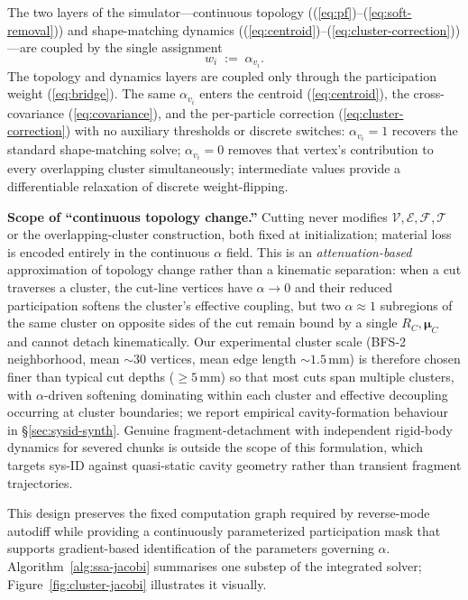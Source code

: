 \documentclass[letterpaper, 10 pt, conference]{ieeeconf}  %
\theoremstyle{tight}
\begin{document}
The two layers of the simulator---continuous topology
((\ref{eq:pf})--(\ref{eq:soft-removal})) and shape-matching dynamics
((\ref{eq:centroid})--(\ref{eq:cluster-correction}))---are coupled by
the single assignment
\begin{equation}
  w_i \;:=\; \alpha_{v_i}.
  \label{eq:bridge}
\end{equation}
The topology and dynamics layers are coupled only through the
participation weight (\ref{eq:bridge}). The same $\alpha_{v_i}$
enters the centroid (\ref{eq:centroid}), the cross-covariance
(\ref{eq:covariance}), and the per-particle correction
(\ref{eq:cluster-correction}) with no auxiliary thresholds or discrete
switches: $\alpha_{v_i} \!=\! 1$ recovers the standard shape-matching
solve; $\alpha_{v_i} \!=\! 0$ removes that vertex's contribution to
every overlapping cluster simultaneously; intermediate values provide
a differentiable relaxation of discrete weight-flipping.

\textbf{Scope of ``continuous topology change.''} Cutting never
modifies $\mathcal{V}, \mathcal{E}, \mathcal{F}, \mathcal{T}$ or the
overlapping-cluster construction, both fixed at initialization;
material loss is encoded entirely in the continuous $\alpha$ field.
This is an \emph{attenuation-based} approximation of topology change
rather than a kinematic separation: when a cut traverses a cluster,
the cut-line vertices have $\alpha \!\to\! 0$ and their reduced
participation softens the cluster's effective coupling, but two
$\alpha \!\approx\! 1$ subregions of the same cluster on opposite
sides of the cut remain bound by a single $R_C, \boldsymbol{\mu}_C$
and cannot detach kinematically. Our experimental cluster scale
(BFS-2 neighborhood, mean $\sim\!30$ vertices, mean edge length
$\sim\!1.5$\,mm) is therefore chosen finer than typical cut depths
($\geq\!5$\,mm) so that most cuts span multiple clusters, with
$\alpha$-driven softening dominating within each cluster and effective
decoupling occurring at cluster boundaries; we report empirical
cavity-formation behaviour in \S\ref{sec:sysid-synth}. Genuine
fragment-detachment with independent rigid-body dynamics for severed
chunks is outside the scope of this formulation, which targets
sys-ID against quasi-static cavity geometry rather than transient
fragment trajectories.

This design preserves the fixed computation graph required by
reverse-mode autodiff while providing a continuously parameterized
participation mask that supports gradient-based identification of the
parameters governing $\alpha$. Algorithm~\ref{alg:ssa-jacobi} summarises
one substep of the integrated solver; Figure~\ref{fig:cluster-jacobi}
illustrates it visually.
\end{document}
